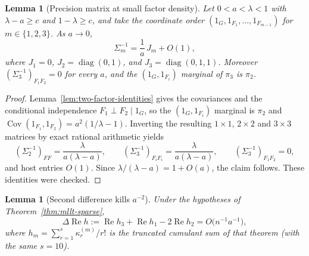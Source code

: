 \documentclass[11pt]{article}
\newtheorem{lemma}[theorem]{Lemma}
\begin{document}
\begin{lemma}[Precision matrix at small factor density]
\label{lem:precision-lead}
Let \(0<a<\lambda<1\) with \(\lambda-a\ge c\) and \(1-\lambda\ge c\), and take the
coordinate order \((1_G,1_{F_1},\ldots,1_{F_{m-1}})\) for \(m\in\{1,2,3\}\).
As \(a\to0\),
\[
\Sigma_m^{-1}=\frac1a\,J_m+O(1),
\]
where \(J_1=0\), \(J_2=\operatorname{diag}(0,1)\), and
\(J_3=\operatorname{diag}(0,1,1)\). Moreover
\((\Sigma_3^{-1})_{F_1F_2}=0\) for every \(a\), and the
\((1_G,1_{F_i})\) marginal of \(\pi_3\) is \(\pi_2\).
\end{lemma}

\begin{proof}
Lemma~\ref{lem:two-factor-identities} gives the covariances and the
conditional independence \(F_1\perp F_2\mid 1_G\), so the
\((1_G,1_{F_i})\) marginal is \(\pi_2\) and
\(\operatorname{Cov}(1_{F_1},1_{F_2})=a^2(1/\lambda-1)\).
Inverting the resulting \(1\times1\), \(2\times2\) and \(3\times3\) matrices by
exact rational arithmetic yields
\[
(\Sigma_2^{-1})_{FF}=\frac{\lambda}{a(\lambda-a)},
\qquad
(\Sigma_3^{-1})_{F_iF_i}=\frac{\lambda}{a(\lambda-a)},
\qquad
(\Sigma_3^{-1})_{F_1F_2}=0,
\]
and host entries \(O(1)\). Since \(\lambda/(\lambda-a)=1+O(a)\), the claim
follows. These identities were checked.
\end{proof}

\begin{lemma}[Second difference kills \(a^{-2}\)]
\label{lem:sparse-second-diff}
Under the hypotheses of Theorem~\ref{thm:mllt-sparse},
\[
\Delta\operatorname{Re}h
:=
\operatorname{Re}h_3+\operatorname{Re}h_1-2\operatorname{Re}h_2
=
O\bigl(n^{-1}a^{-1}\bigr),
\]
where \(h_m=\sum_{r=1}^s\kappa_r^{(m)}/r!\) is the truncated cumulant sum of
that theorem (with the same \(s=10\)).
\end{lemma}
\end{document}
